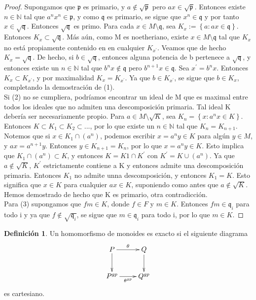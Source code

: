 \documentclass[12pt,spanish]{amsart}
\newcommand{\bb}[1]{\mathbb{#1}}
\newcommand{\fk}[1]{\mathfrak{#1}}
\newcommand{\set}[1]{\left\{{#1}\right\}}
\theoremstyle{definition}
\newtheorem{Def}[Theorem]{Definición}
\theoremstyle{remark}
\begin{document}
\begin{proof}
Supongamos que $\fk{p}$ es primario, y $a\notin \sqrt{\fk{p}}$ pero $ax\in \sqrt{\fk{p}}$. Entonces existe $n\in \bb{N}$ tal que $a^{n}x^{n}\in \fk{p}$, y como $\fk{q}$ es primario, se sigue que $x^{n}\in \fk{q}$ y por tanto $x\in \sqrt{\fk{q}}$. Entonces $\sqrt{\fk{q}}$ es primo. Para cada $x\in M\setminus \fk{q}$, sea $K_{x}:=\set{a:ax\in \fk{q}}$. Entonces $K_{x} \subset \sqrt{\fk{q}}$. Más aún, como M es noetheriano, existe $x\in M\setminus \fk{q}$ tal que $K_{x}$ no está propiamente contenido en en cualquier $K_{x^{\prime}}$. Veamos que de hecho $K_{x}=\sqrt{\fk{q}}$. De hecho, si $b\in \sqrt{\fk{q}}$, entonces alguna potencia de b pertenece a $\sqrt{\fk{q}}$, y entonces existe un $n\in \bb{N}$ tal que $b^{n}x\notin \fk{q}$ pero $b^{n+1}x\in \fk{q}$. Sea $x^{\prime}=b^{n}x$. Entonces $K_{x} \subset K_{x^{\prime}}$, y por maximalidad $K_{x}=K_{x^{\prime}}$. Ya que $b\in K_{x^{\prime}}$, se sigue que $b\in K_{x}$, completando la demostración de (1). \\
Si (2) no se cumpliera, podríamos encontrar un ideal de M que es maximal entre todos los ideales que no admiten una descomposición primaria. Tal ideal K debería ser necesariamente propio. Para $a\in  M \setminus \sqrt{K}$, sea $K_{n}=\set{x:a^{n}x\in K}$. Entonces $K \subset K_{1} \subset K_{2} \subset ...$, por lo que existe un $n\in \bb{N}$ tal que $K_{n}=K_{n+1}$. Notemos que si $x\in K_{1} \cap (a^{n})$, podemos escribir $x=a^{n}y\in K$ para algún $y\in M$, y $ax=a^{n+1}y$. Entonces $y\in K_{n+1}=K_{n}$, por lo que $x=a^{n}y\in K$. Esto implica que $K_{1} \cap (a^{n}) \subset K$, y entonces $K=K{1} \cap K^{\prime}$ con $K^{\prime}=K \cup (a^{n})$. Ya que $a\notin \sqrt{K}$, $K^{\prime}$ estrictamente contiene a K y entonces admite una descomposición primaria. Entonces $K_{1}$ no admite unna descomposición, y entonces $K_{1}=K$. Esto significa que $x\in K$ para cualquier $ax\in K$, suponiendo como antes que $a\notin \sqrt{K}$. Hemos demostrado de hecho que K es primario, otra contradicción. \\
Para (3) supongamos que $fm\in K$, donde $f\in F$ y $m\in K$. Entonces $fm\in \fk{q}_{i}$ para todo i y ya que $f\notin \sqrt{\fk{q}_{i}}$, se sigue que $m\in \fk{q}_{i}$ para todo i, por lo que $m\in K$. 
 \end{proof}


\begin{Def}
Un homomorfismo de monoides es exacto si el siguiente diagrama
$$\xymatrix{
P \ar[d] \ar[r]^{\theta} & Q \ar[d] \\
P^{gp} \ar[r]_{\theta^{gp}} & Q^{gp}
}
$$
es cartesiano. 
\end{Def}
\end{document}

